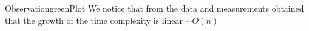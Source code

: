 \begin{prettyBox}{Observation}{greenPlot}
We notice that from the data and measurements obtained that the growth of the time complexity is linear \(\sim O(n)\)
\end{prettyBox}
